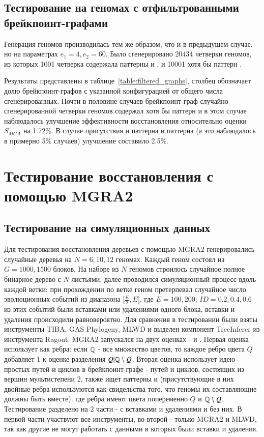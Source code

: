 \subsection{Тестирование на геномах с отфильтрованными брейкпоинт-графами}
Генерация геномов производилась тем же образом, что и в предыдущем случае, но на параметрах $e_1 = 4, e_2 = 60$.
Было сгенерировано 20434 четверки геномов, из которых 1001 четверка содержала паттерны  и ,
и 10001 хотя бы паттерн .

Результаты представлены в таблице~\ref{table:filtered_graphs}, столбец  обозначает долю брейкпоинт-графов с указанной конфигурацией
от общего числа сгенерированных. Почти в половине случаев брейкпоинт-граф случайно сгенерированной четверки геномов содержал
хотя бы паттерн  и в этом случае наблюдалось улучшение эффективности восстановления относительно оценки $S_{MCA}$ на 1.72\%.
В случае присутствия и паттерна  и паттерна  (а это наблюдалось в примерно 5\% случаев) улучшение составило 2.5\%.

\section{Тестирование восстановления с помощью MGRA2}
\subsection{Тестирование на симуляционных данных}
Для тестирования восстановления деревьев с помощью MGRA2 генерировались случайные деревья на $N = 6, 10, 12$ геномах.
Каждый геном состоял из $G = 1000, 1500$ блоков.
На наборе из $N$ геномов строилось случайное полное бинарное дерево с $N$ листьями, далее проводился симуляционный процесс вдоль каждой ветки:
при прохождении по ветке геном претерпевал случайное число эволюционных событий из диапазона $\lbrack \frac{E}{2}, E \rbrack$,
где $E = 100, 200$; $ID = 0.2, 0.4, 0.6$ из этих событий были вставками или удалениями одного блока, вставки и удаления происходили равновероятно.
Для сравнения в тестировании были взяты инструменты TIBA, GAS Phylogeny, MLWD и выделен компонент TreeInferer из инструмента Ragout.
MGRA2 запускался на двух оценках -  и .
Первая оценка использует как  ребра: если $\mathbb{Q}$ - все множество цветов,
то каждое ребро цвета $Q$ добавляет 1 к оценке разделения $Q|\mathbb{Q} \setminus Q$.
Вторая оценка использует идею простых путей и циклов в брейкпоинт-графе - путей и циклов, состоящих из вершин мультистепени 2,
также ищет паттерны  и  (присутствующие в них двойные ребра используются как свидельства того, что геномы
их составляющие должны быть вместе).
где ребра имеют цвета попеременно $Q$ и $\mathbb{Q} \setminus Q$.
Тестирование разделено на 2 части - с вставками и удалениями и без них.
В первой части участвуют все инструменты, во второй - только MGRA2 и MLWD,
так как другие не могут работать с данными в которых были вставки и удаления.

